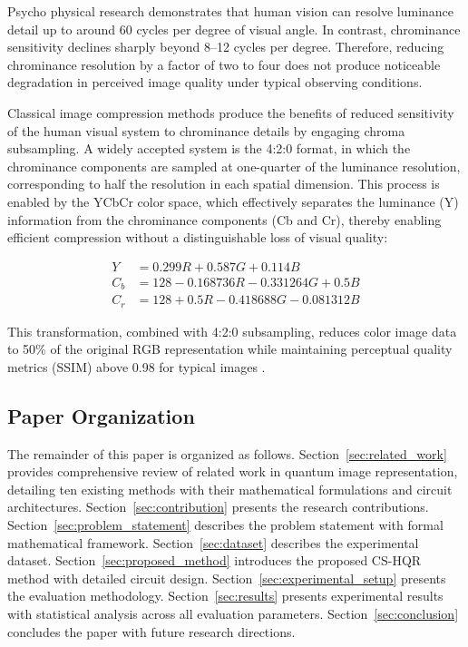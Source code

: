 \documentclass[11pt,a4paper]{article}
\begin{document}
Psycho physical research demonstrates that human vision can resolve luminance detail up to around 60 cycles per degree of visual angle. In contrast, chrominance sensitivity declines sharply beyond 8–12 cycles per degree. Therefore, reducing chrominance resolution by a factor of two to four does not produce noticeable degradation in perceived image quality under typical observing conditions.

Classical image compression methods produce the benefits of reduced sensitivity of the human visual system to chrominance details by engaging chroma subsampling. A widely accepted system is the 4:2:0 format, in which the chrominance components are sampled at one-quarter of the luminance resolution, corresponding to half the resolution in each spatial dimension. This process is enabled by the YCbCr color space, which effectively separates the luminance (Y) information from the chrominance components (Cb and Cr), thereby enabling efficient compression without a distinguishable loss of visual quality:

\begin{align}
Y &= 0.299R + 0.587G + 0.114B \label{eq:y}\\
C_b &= 128 - 0.168736R - 0.331264G + 0.5B \label{eq:cb}\\
C_r &= 128 + 0.5R - 0.418688G - 0.081312B \label{eq:cr}
\end{align}

This transformation, combined with 4:2:0 subsampling, reduces color image data to 50\% of the original RGB representation while maintaining perceptual quality metrics (SSIM) above 0.98 for typical images \cite{ref22}.

\subsection{Paper Organization}
\label{subsec:paper_organization}

The remainder of this paper is organized as follows. Section~\ref{sec:related_work} provides comprehensive review of related work in quantum image representation, detailing ten existing methods with their mathematical formulations and circuit architectures. Section~\ref{sec:contribution} presents the research contributions. Section~\ref{sec:problem_statement} describes the problem statement with formal mathematical framework. Section~\ref{sec:dataset} describes the experimental dataset. Section~\ref{sec:proposed_method} introduces the proposed CS-HQR method with detailed circuit design. Section~\ref{sec:experimental_setup} presents the evaluation methodology. Section~\ref{sec:results} presents experimental results with statistical analysis across all evaluation parameters. Section~\ref{sec:conclusion} concludes the paper with future research directions.
\end{document}
